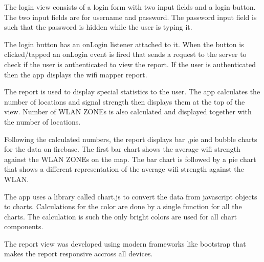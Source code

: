 The login view consists of a login form with two input fields and a login button. The two input fields are for username and password. The password input field is such that the password is hidden while the user is typing it. 

The login button has an onLogin listener attached to it. When the button is clicked/tapped an onLogin event is fired that sends a request to the server to check if the user is authenticated to view the report. If the user is authenticated then the app displays the wifi mapper report.

The report is used to display special statistics to the user. The app calculates the number of locations and signal strength then displays them at the top of the view. Number of WLAN ZONEs is also calculated and displayed together with the number of locations.

Following the calculated numbers, the report displays bar ,pie and bubble charts for the data on firebase. The first bar chart shows the average wifi strength against the WLAN ZONEs on the map. The bar chart is followed by a pie chart that shows a different representation of the average wifi strength against the WLAN.

The app uses a library called chart.js to convert the data from javascript objects to charts. Calculations for the color are done by a single function for all the charts. The calculation is such the only bright colors are used for all chart components.

The report view was developed using modern frameworks like bootstrap that makes the report responsive accross all devices.

